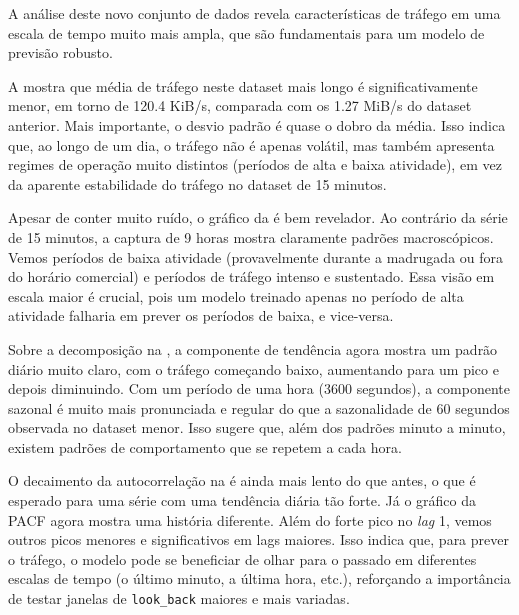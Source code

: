 A análise deste novo conjunto de dados revela características de tráfego em uma escala de tempo muito mais
ampla, que são fundamentais para um modelo de previsão robusto.

A  mostra que média de tráfego neste dataset mais longo é significativamente menor,
em torno de 120.4 KiB/s, comparada com os 1.27 MiB/s do dataset anterior. Mais importante, o desvio padrão é
quase o dobro da média. Isso indica que, ao longo de um dia, o tráfego não é apenas volátil, mas também
apresenta regimes de operação muito distintos (períodos de alta e baixa atividade), em vez da aparente
estabilidade do tráfego no dataset de 15 minutos.

Apesar de conter muito ruído, o gráfico da  é bem revelador. Ao contrário da série
de 15 minutos, a captura de 9 horas mostra claramente padrões macroscópicos. Vemos períodos de baixa
atividade (provavelmente durante a madrugada ou fora do horário comercial) e períodos de tráfego intenso e
sustentado. Essa visão em escala maior é crucial, pois um modelo treinado apenas no período de alta atividade
falharia em prever os períodos de baixa, e vice-versa.

Sobre a decomposição na , a componente de tendência agora mostra um padrão
diário muito claro, com o tráfego começando baixo, aumentando para um pico e depois diminuindo. Com um
período de uma hora (3600 segundos), a componente sazonal é muito mais pronunciada e regular do que a
sazonalidade de 60 segundos observada no dataset menor. Isso sugere que, além dos padrões minuto a minuto,
existem padrões de comportamento que se repetem a cada hora.

O decaimento da autocorrelação na  é ainda mais lento do que antes, o que é esperado
para uma série com uma tendência diária tão forte. Já o gráfico da PACF agora mostra uma história diferente.
Além do forte pico no \emph{lag} 1, vemos outros picos menores e significativos em lags maiores. Isso indica
que, para prever o tráfego, o modelo pode se beneficiar de olhar para o passado em diferentes escalas de
tempo (o último minuto, a última hora, etc.), reforçando a importância de testar janelas de
\texttt{look_back} maiores e mais variadas.
